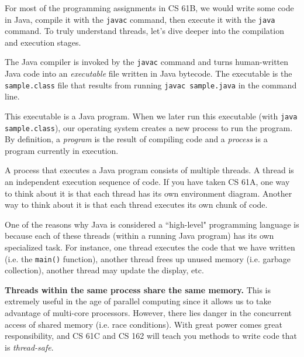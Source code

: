 \question For most of the programming assignments in CS 61B, we would write some code in Java, compile it with the \texttt{javac} command, then execute it with the \texttt{java} command. To truly understand threads, let's dive deeper into the compilation and execution stages.

The Java compiler is invoked by the \texttt{javac} command and turns human-written Java code into an \textit{executable} file written in Java bytecode. The {executable} is the \texttt{sample.class} file that results from running \texttt{javac sample.java} in the command line.

This executable is a Java program. When we later run this executable (with \texttt{java sample.class}), our operating system creates a new process to run the program. By definition, a \textit{program} is the result of compiling code and a \textit{process} is a program currently in execution. 

A process that executes a Java program consists of multiple threads. A thread is an independent execution sequence of code. If you have taken CS 61A, one way to think about it is that each thread has its own environment diagram. Another way to think about it is that each thread executes its own chunk of code.

One of the reasons why Java is considered a ``high-level" programming language is because each of these threads (within a running Java program) has its own specialized task. For instance, one thread executes the code that we have written (i.e. the \texttt{main()} function), another thread frees up unused memory (i.e. garbage collection), another thread may update the display, etc.

\textbf{Threads within the same process share the same memory.} This is extremely useful in the age of parallel computing since it allows us to take advantage of multi-core processors. However, there lies danger in the concurrent access of shared memory (i.e. race conditions). With great power comes great responsibility, and CS 61C and CS 162 will teach you methods to write code that is \textit{thread-safe}.

